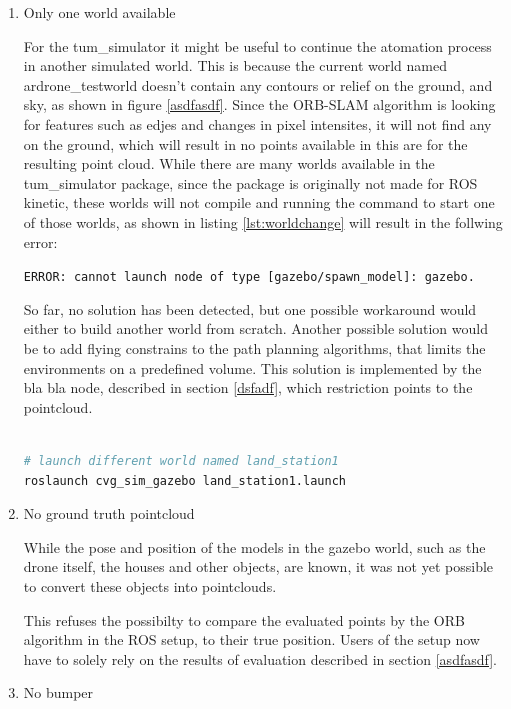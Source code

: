 	\begin{enumerate}
	
	\item{Only one world available}
	
	For the tum\_simulator it might be useful to continue the atomation process in another simulated world. This is because the current world named ardrone\_testworld
	doesn't contain any contours or relief on the ground, and sky, as shown in figure \ref{asdfasdf}. Since the ORB-SLAM algorithm is looking for features such as edjes and changes in pixel intensites, 
	it will not find any on the ground, which will result in no points available in this are for the resulting point cloud. While there are many worlds available in the 
	tum\_simulator package, since the package is originally not made for ROS kinetic, these worlds will not compile and running the command to start one of those worlds, 
	as shown in listing \ref{lst:worldchange} will result in the follwing error: 
	
	\texttt{ERROR: cannot launch node of type [gazebo/spawn\_model]: gazebo.}
	
	So far, no solution has been detected, but one possible workaround would either to build another world from scratch. Another possible solution would be to add flying 
	constrains to the path planning algorithms, that limits the environments on a predefined volume. This solution is implemented by the bla bla node, described in section 
	\ref{dsfadf}, which restriction points to the pointcloud. 
	
	
\begin{lstlisting}[language=bash, caption= Launching different world, label=lst:worldchange]
	
# launch different world named land_station1
roslaunch cvg_sim_gazebo land_station1.launch

\end{lstlisting}

	\item{No ground truth pointcloud}
	
	While the pose and position of the models in the gazebo world, such as the drone itself, the houses and other objects, are known, it was not yet possible 
	to convert these objects into pointclouds. 
	
	
	This refuses the possibilty to compare the evaluated points by the ORB algorithm in the ROS setup, to their true position. Users of the setup now have to solely
	rely on the results of evaluation described in section \ref{asdfasdf}.
	
	\item{No bumper}

	\end{enumerate}